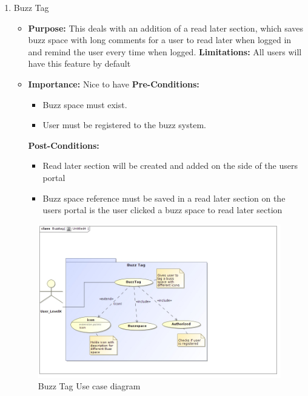 \documentclass[11pt]{article}
\begin{document}
\begin{enumerate}
\item Buzz Tag
\begin{itemize}
\item \textbf{Purpose:}
This deals with an addition of a read later section, which saves
buzz space with long comments for a user to read later when logged
in and remind the user every time when logged.
\newline
\textbf{Limitations:} 
All users will have this feature by default

\item \textbf{Importance:}  Nice to have\newline
\textbf{Pre-Conditions: }
	\begin{itemize}
	\item Buzz space must exist.
	\item User must be registered to the buzz system.

	\end{itemize}

\textbf{Post-Conditions: }
	\begin{itemize}
	\item Read later section will be created and added on the side of the
users portal
	\item Buzz space reference must be saved in a read later section on the
users portal is the user clicked a buzz space to read later section
	
	\end{itemize}
\end{itemize}

\begin{figure}[H]	
\graphicspath{ {../Diagrams/sfiso/} }
    	\includegraphics[scale=0.5]{tag.jpg}
    	\caption{Buzz Tag Use case diagram}
	\end{figure}


\end{enumerate}
\end{document}
